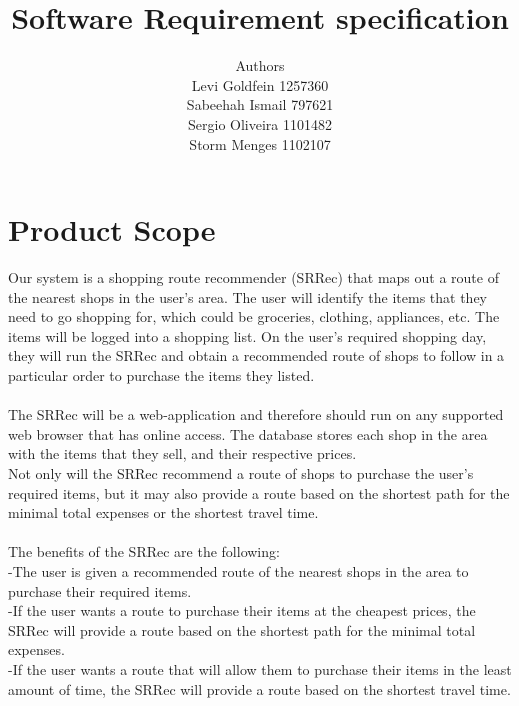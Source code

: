 \documentclass[12pt]{article}
\newenvironment{Project}[2][Project]{\begin{trivlist}
\item[\hskip \labelsep {\bfseries #1}\hskip \labelsep {\bfseries #2.}]}{\end{trivlist}}
\begin{document}
 
 
\title{Software Requirement specification }
\author{Authors\\Levi Goldfein 1257360\\Sabeehah Ismail 797621\\ Sergio Oliveira 1101482 \\Storm Menges 1102107}
\maketitle
 
\begin{Project}{: Shopping Route Recommender}

\end{Project}
\section{Product Scope} 
Our system is a shopping route recommender (SRRec) that maps out a route of the nearest shops in the user's area. The user will identify the items that they need to go shopping for, which could be groceries, clothing, appliances, etc. The items will be logged into a shopping list. On the user's required shopping day, they will run the SRRec and obtain a recommended route of shops to follow in a particular order to purchase the items they listed.\\\\
The SRRec will be a web-application and therefore should run on any supported web browser that has online access. The database stores each shop in the area with the items that they sell, and their respective prices.\\
Not only will the SRRec recommend a route of shops to purchase the user's required items, but it may also provide a route based on the shortest path for the minimal total expenses or the shortest travel time.\\\\
The benefits of the SRRec are the following:\\
-The user is given a recommended route of the nearest shops in the area to purchase their required items.\\
-If the user wants a route to purchase their items at the cheapest prices, the SRRec will provide a route based on the shortest path for the minimal total expenses.\\
-If the user wants a route that will allow them to purchase their items in the least amount of time, the SRRec will provide a route based on the shortest travel time.
\end{document}
